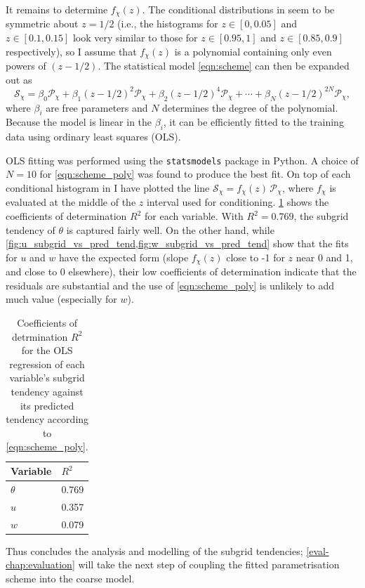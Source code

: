 \documentclass[../main.tex]{subfiles}
\begin{document}
It remains to determine $f_\chi(z)$. The conditional distributions in
seem to be symmetric about $z=1/2$ (i.e., the histograms for $z \in [0, 0.05]$
and $z \in [0.1, 0.15]$ look very similar to those for $z \in [0.95, 1]$ and $z
\in [0.85, 0.9]$ respectively), so I assume that $f_\chi(z)$ is a polynomial
containing only even powers of $(z - 1/2)$. The statistical model
\cref{eqn:scheme} can then be expanded out as
\begin{equation} \label{eqn:scheme_poly}
    \mathcal{S}_\chi =
        \beta_0 \mathcal{P}_\chi + \beta_1 (z - 1/2)^2 \mathcal{P}_\chi
        + \beta_2 (z - 1/2)^4 \mathcal{P}_\chi + \cdots
        + \beta_N (z - 1/2)^{2N} \mathcal{P}_\chi,
\end{equation}
where $\beta_i$ are free parameters and $N$ determines the degree of the
polynomial. Because the model is linear in the $\beta_i$, it can be
efficiently fitted to the training data using ordinary least squares (OLS).

OLS fitting was performed using the \texttt{statsmodels} package in Python. A
choice of $N = 10$ for \cref{eqn:scheme_poly} was found to produce the best
fit. On top of each conditional histogram in
I have plotted the line $\mathcal{S}_\chi =  f_\chi(z)\,\mathcal{P}_\chi$,
where $f_\chi$ is evaluated at the middle of the $z$ interval used for
conditioning. \cref{tab:r_squared} shows the coefficients of determination
$R^2$ for each variable. With $R^2 = 0.769$, the subgrid tendency of $\theta$
is captured fairly well. On the other hand, while
\cref{fig:u_subgrid_vs_pred_tend,fig:w_subgrid_vs_pred_tend} show that the fits
for $u$ and $w$ have the expected form (slope $f_\chi(z)$ close to -1 for $z$
near 0 and 1, and close to 0 elsewhere), their low coefficients of
determination indicate that the residuals are substantial and the use of
\cref{eqn:scheme_poly} is unlikely to add much value (especially for $w$).

\begin{table}[ht]
\centering
\begin{tabular}{l l}
    \toprule
    Variable & $R^2$ \\
    \midrule
    $\theta$ & 0.769 \\
    $u$ & 0.357 \\
    $w$ & 0.079 \\
    \bottomrule
\end{tabular}
\caption{
    Coefficients of detrmination $R^2$ for the OLS regression of each
    variable's subgrid tendency against its predicted tendency according to
    \cref{eqn:scheme_poly}.
}
\label{tab:r_squared}
\end{table}

Thus concludes the analysis and modelling of the subgrid tendencies;
\cref{eval-chap:evaluation} will take the next step of coupling the fitted
parametrisation scheme into the coarse model.


\ifSubfilesClassLoaded{%
    \emergencystretch=5em
    \printbibliography{}
}{}
\end{document}

